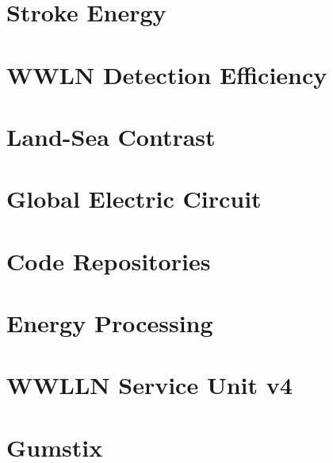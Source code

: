 \documentclass [11pt, twoside] {uwthesis}[2012/06/19]
\begin{document}
 
\chapter{Stroke Energy}
\label{ch:energy}




\chapter{WWLN Detection Efficiency}
\label{ch:de}




\chapter{Land-Sea Contrast}



 
\chapter{Global Electric Circuit}



%
%





%
%

\appendix
\raggedbottom\sloppy
 

\chapter{Code Repositories}
\label{app:code}



\chapter{Energy Processing}
\label{app:energy}



\chapter{WWLLN Service Unit v4}
\label{app:su}



\chapter{Gumstix}
\label{app:gumstix}



\end{document}

